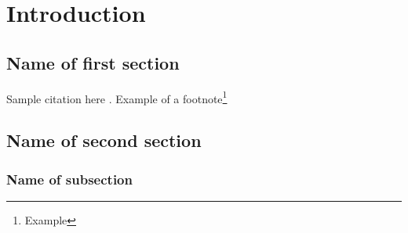 \chapter{Introduction}\label{chap: intro}
\setcounter{page}{1}


\vspace*{-2mm}
\section{Name of first section}\label{sec: chap1 motivation}
Sample citation here \cite{Rijnen1,Rijnen2}. Example of a footnote\footnote{Example}
\lipsum[9-13]


\section{Name of second section}\label{sec: chap1 background}

\lipsum[14-18]

\subsection{Name of subsection}\label{subsec: chap1 background2}

